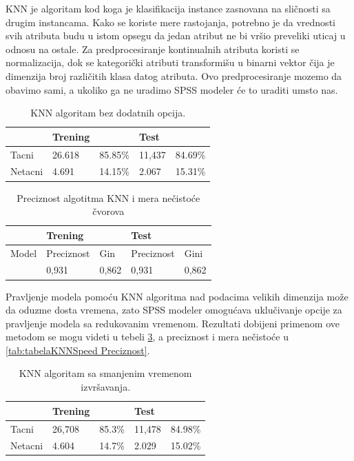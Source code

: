 \documentclass[a4paper]{article}
\begin{document}
KNN je algoritam kod koga je klasifikacija instance zasnovana na sličnosti sa drugim
instancama. Kako se koriste mere rastojanja, potrebno je da vrednosti svih atributa budu u istom opsegu da jedan atribut ne bi vršio preveliki uticaj u odnosu na ostale. Za predprocesiranje kontinualnih atributa koristi se normalizacija, dok se kategorički atributi transformišu u binarni vektor čija je dimenzija broj različitih klasa datog atributa. Ovo predprocesiranje mozemo da obavimo sami, a ukoliko ga ne uradimo SPSS modeler će to uraditi umsto nas.
\begin{table}[h!]
\begin{center}
\caption{KNN algoritam bez dodatnih opcija.}
\begin{tabular}{|l|l|l|l|l|} \hline
& Trening& & Test & \\ \hline
Tacni &26.618 &85.85\% &11,437 &84.69\%\\ \hline
Netacni&4.691 &14.15\% &2.067 &15.31\%\\ \hline
\end{tabular}
\label{tab:tabelaKNN}
\end{center}
\end{table}


\begin{table}[h!]
\begin{center}
\caption{Preciznost algotitma KNN i mera nečistoće čvorova}
\begin{tabular}{|l|l|l|l|l|} \hline
& Trening& & Test & \\ \hline
Model &Preciznost&Gin&Preciznost&Gini\\ \hline
&0,931 &0,862&0,931&0,862\\ \hline
\end{tabular}
\label{tab:tabelaKNN Preciznost}
\end{center}
\end{table}

Pravljenje modela pomoću KNN algoritma nad podacima velikih dimenzija može da oduzme dosta vremena, zato SPSS modeler omogućava uklučivanje opcije za pravljenje modela sa redukovanim vremenom. Rezultati dobijeni primenom ove metodom se mogu videti u tebeli \ref{tab:tabelaKNNspeed}, a preciznost i mera nečistoće u \ref{tab:tabelaKNNSpeed Preciznost}.


\begin{table}[h!]
\begin{center}
\caption{KNN algoritam sa smanjenim vremenom izvršavanja.}
\begin{tabular}{|l|l|l|l|l|} \hline
& Trening& & Test & \\ \hline
Tacni &26,708 &85.3\% &11,478 &84.98\%\\ \hline
Netacni&4.604 &14.7\% &2.029 &15.02\%\\ \hline
\end{tabular}
\label{tab:tabelaKNNspeed}
\end{center}
\end{table}
\end{document}
